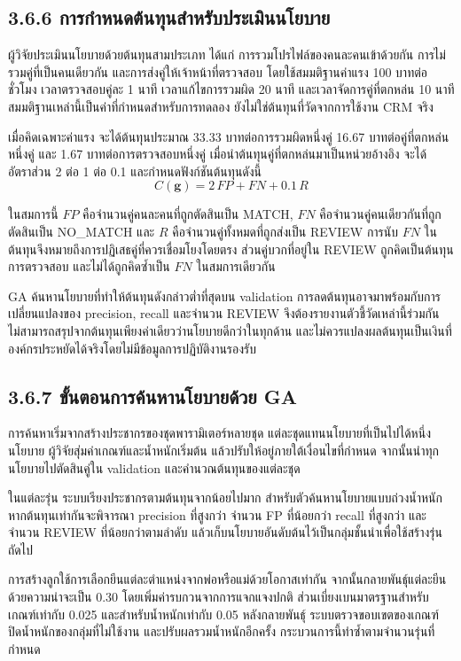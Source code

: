 \documentclass[12pt,a4paper]{report}
\begin{document}
\subsection*{3.6.6 การกำหนดต้นทุนสำหรับประเมินนโยบาย}
ผู้วิจัยประเมินนโยบายด้วยต้นทุนสามประเภท ได้แก่ การรวมโปรไฟล์ของคนละคนเข้าด้วยกัน การไม่รวมคู่ที่เป็นคนเดียวกัน และการส่งคู่ให้เจ้าหน้าที่ตรวจสอบ โดยใช้สมมติฐานค่าแรง 100 บาทต่อชั่วโมง เวลาตรวจสอบคู่ละ 1 นาที เวลาแก้ไขการรวมผิด 20 นาที และเวลาจัดการคู่ที่ตกหล่น 10 นาที สมมติฐานเหล่านี้เป็นค่าที่กำหนดสำหรับการทดลอง ยังไม่ใช่ต้นทุนที่วัดจากการใช้งาน CRM จริง

เมื่อคิดเฉพาะค่าแรง จะได้ต้นทุนประมาณ 33.33 บาทต่อการรวมผิดหนึ่งคู่ 16.67 บาทต่อคู่ที่ตกหล่นหนึ่งคู่ และ 1.67 บาทต่อการตรวจสอบหนึ่งคู่ เมื่อนำต้นทุนคู่ที่ตกหล่นมาเป็นหน่วยอ้างอิง จะได้อัตราส่วน 2 ต่อ 1 ต่อ 0.1 และกำหนดฟังก์ชันต้นทุนดังนี้
\begin{equation*}
C(\boldsymbol{g})=2\,FP+FN+0.1\,R
\end{equation*}

ในสมการนี้ $FP$ คือจำนวนคู่คนละคนที่ถูกตัดสินเป็น MATCH, $FN$ คือจำนวนคู่คนเดียวกันที่ถูกตัดสินเป็น NO\_MATCH และ $R$ คือจำนวนคู่ทั้งหมดที่ถูกส่งเป็น REVIEW การนับ $FN$ ในต้นทุนจึงหมายถึงการปฏิเสธคู่ที่ควรเชื่อมโยงโดยตรง ส่วนคู่บวกที่อยู่ใน REVIEW ถูกคิดเป็นต้นทุนการตรวจสอบ และไม่ได้ถูกคิดซ้ำเป็น $FN$ ในสมการเดียวกัน

GA ค้นหานโยบายที่ทำให้ต้นทุนดังกล่าวต่ำที่สุดบน validation การลดต้นทุนอาจมาพร้อมกับการเปลี่ยนแปลงของ precision, recall และจำนวน REVIEW จึงต้องรายงานตัวชี้วัดเหล่านี้ร่วมกัน ไม่สามารถสรุปจากต้นทุนเพียงค่าเดียวว่านโยบายดีกว่าในทุกด้าน และไม่ควรแปลงผลต้นทุนเป็นเงินที่องค์กรประหยัดได้จริงโดยไม่มีข้อมูลการปฏิบัติงานรองรับ

\subsection*{3.6.7 ขั้นตอนการค้นหานโยบายด้วย GA}
การค้นหาเริ่มจากสร้างประชากรของชุดพารามิเตอร์หลายชุด แต่ละชุดแทนนโยบายที่เป็นไปได้หนึ่งนโยบาย ผู้วิจัยสุ่มค่าเกณฑ์และน้ำหนักเริ่มต้น แล้วปรับให้อยู่ภายใต้เงื่อนไขที่กำหนด จากนั้นนำทุกนโยบายไปตัดสินคู่ใน validation และคำนวณต้นทุนของแต่ละชุด

ในแต่ละรุ่น ระบบเรียงประชากรตามต้นทุนจากน้อยไปมาก สำหรับตัวค้นหานโยบายแบบถ่วงน้ำหนัก หากต้นทุนเท่ากันจะพิจารณา precision ที่สูงกว่า จำนวน FP ที่น้อยกว่า recall ที่สูงกว่า และจำนวน REVIEW ที่น้อยกว่าตามลำดับ แล้วเก็บนโยบายอันดับต้นไว้เป็นกลุ่มชั้นนำเพื่อใช้สร้างรุ่นถัดไป

การสร้างลูกใช้การเลือกยีนแต่ละตำแหน่งจากพ่อหรือแม่ด้วยโอกาสเท่ากัน จากนั้นกลายพันธุ์แต่ละยีนด้วยความน่าจะเป็น 0.30 โดยเพิ่มค่ารบกวนจากการแจกแจงปกติ ส่วนเบี่ยงเบนมาตรฐานสำหรับเกณฑ์เท่ากับ 0.025 และสำหรับน้ำหนักเท่ากับ 0.05 หลังกลายพันธุ์ ระบบตรวจขอบเขตของเกณฑ์ ปิดน้ำหนักของกลุ่มที่ไม่ใช้งาน และปรับผลรวมน้ำหนักอีกครั้ง กระบวนการนี้ทำซ้ำตามจำนวนรุ่นที่กำหนด
\end{document}
